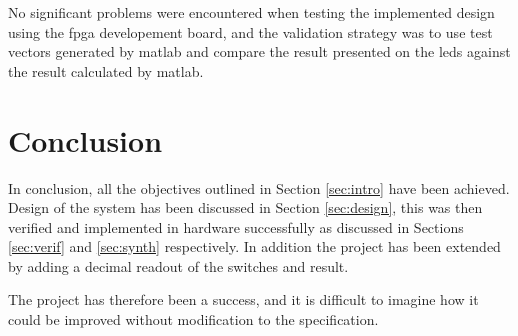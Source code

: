 No significant problems were encountered when testing the implemented design using the \gls{fpga} developement board, and the validation strategy was to use test vectors generated by \gls{matlab} and compare the result presented on the \glspl{led} against the result calculated by \gls{matlab}.

\FloatBarrier
\section{Conclusion}  \label{sec:conclusion}
In conclusion, all the objectives outlined in Section \ref{sec:intro} have been achieved. Design of the system has been discussed in Section \ref{sec:design}, this was then verified and implemented in hardware successfully as discussed in Sections \ref{sec:verif} and \ref{sec:synth} respectively. In addition the project has been extended by adding a decimal readout of the switches and result.

The project has therefore been a success, and it is difficult to imagine how it could be improved without modification to the specification.
